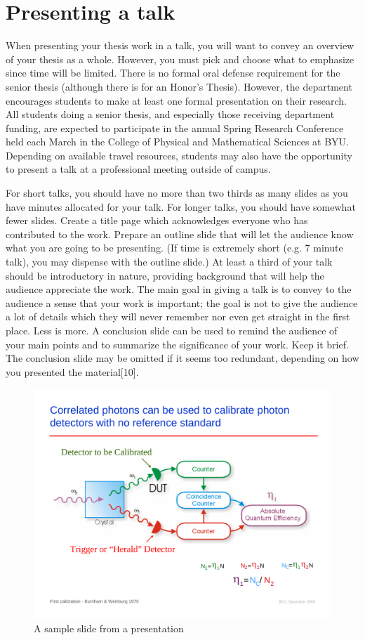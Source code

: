 \chapter{Presenting a talk}
\label{app:Talk}

When presenting your thesis work in a talk, you will want to convey
an overview of your thesis as a whole. However, you must pick and
choose what to emphasize since time will be limited. There is no
formal oral defense requirement for the senior thesis (although
there is for an Honor's Thesis). However, the department encourages
students to make at least one formal presentation on their research.
All students doing a senior thesis, and especially those receiving
department funding, are expected to participate in the annual Spring
Research Conference held each March in the College of Physical and
Mathematical Sciences at BYU. Depending on available travel
resources, students may also have the opportunity to present a talk
at a professional meeting outside of campus.

For short talks, you should have no more than two thirds as many
slides as you have minutes allocated for your talk. For longer
talks, you should have somewhat fewer slides. Create a title page
which acknowledges everyone who has contributed to the work. Prepare
an outline slide that will let the audience know what you are going
to be presenting. (If time is extremely short (e.g. 7 minute talk),
you may dispense with the outline slide.) At least a third of your
talk should be introductory in nature, providing background that
will help the audience appreciate the work. The main goal in giving
a talk is to convey to the audience a sense that your work is
important; the goal is not to give the audience a lot of details
which they will never remember nor even get straight in the first
place. Less is more. A conclusion slide can be used to remind the
audience of your main points and to summarize the significance of
your work. Keep it brief. The conclusion slide may be omitted if it
seems too redundant, depending on how you presented the
material[10].

\begin{figure}
    \centerline{\includegraphics[width=6.5in]{slide}}
    \caption{\label{fig:Slide} A sample slide from a presentation}
\end{figure}

